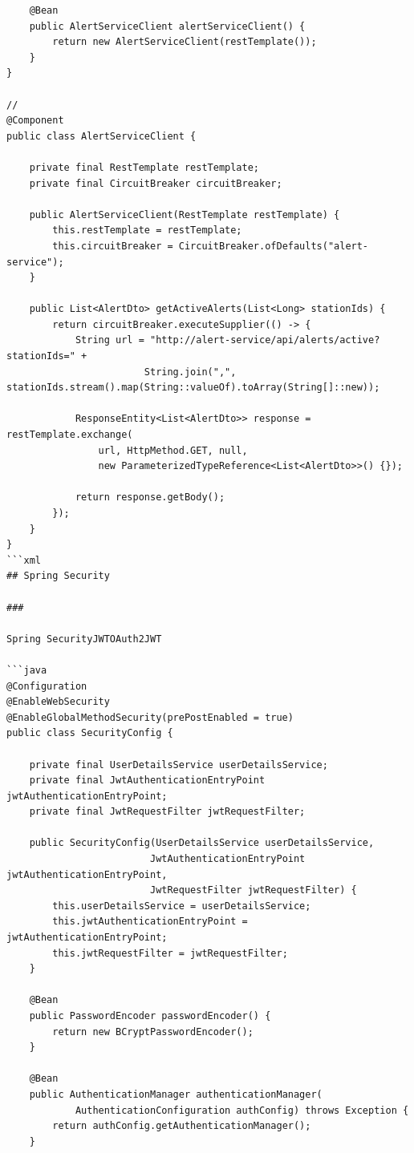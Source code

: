 \begin{verbatim}
    @Bean
    public AlertServiceClient alertServiceClient() {
        return new AlertServiceClient(restTemplate());
    }
}

// 
@Component
public class AlertServiceClient {
    
    private final RestTemplate restTemplate;
    private final CircuitBreaker circuitBreaker;
    
    public AlertServiceClient(RestTemplate restTemplate) {
        this.restTemplate = restTemplate;
        this.circuitBreaker = CircuitBreaker.ofDefaults("alert-service");
    }
    
    public List<AlertDto> getActiveAlerts(List<Long> stationIds) {
        return circuitBreaker.executeSupplier(() -> {
            String url = "http://alert-service/api/alerts/active?stationIds=" + 
                        String.join(",", stationIds.stream().map(String::valueOf).toArray(String[]::new));
                        
            ResponseEntity<List<AlertDto>> response = restTemplate.exchange(
                url, HttpMethod.GET, null, 
                new ParameterizedTypeReference<List<AlertDto>>() {});
                
            return response.getBody();
        });
    }
}
```xml
## Spring Security

### 

Spring SecurityJWTOAuth2JWT

```java
@Configuration
@EnableWebSecurity
@EnableGlobalMethodSecurity(prePostEnabled = true)
public class SecurityConfig {
    
    private final UserDetailsService userDetailsService;
    private final JwtAuthenticationEntryPoint jwtAuthenticationEntryPoint;
    private final JwtRequestFilter jwtRequestFilter;
    
    public SecurityConfig(UserDetailsService userDetailsService,
                         JwtAuthenticationEntryPoint jwtAuthenticationEntryPoint,
                         JwtRequestFilter jwtRequestFilter) {
        this.userDetailsService = userDetailsService;
        this.jwtAuthenticationEntryPoint = jwtAuthenticationEntryPoint;
        this.jwtRequestFilter = jwtRequestFilter;
    }
    
    @Bean
    public PasswordEncoder passwordEncoder() {
        return new BCryptPasswordEncoder();
    }
    
    @Bean
    public AuthenticationManager authenticationManager(
            AuthenticationConfiguration authConfig) throws Exception {
        return authConfig.getAuthenticationManager();
    }
    

\end{verbatim}
